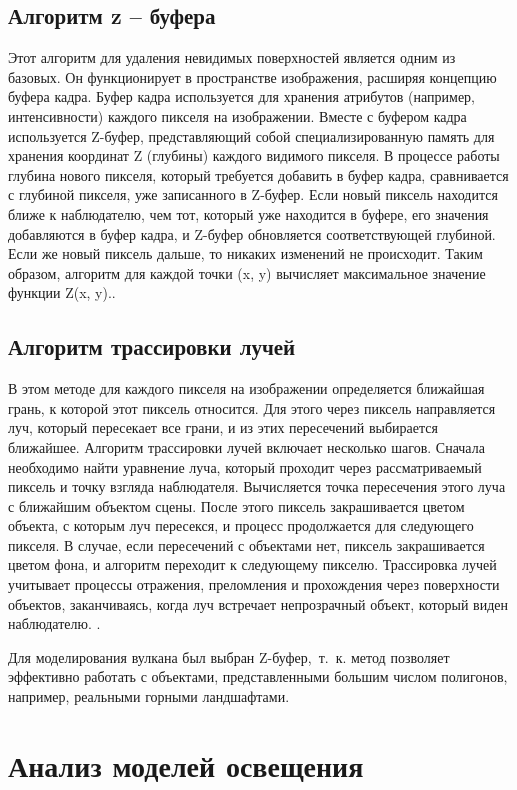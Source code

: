 \subsection{Алгоритм z – буфера}
Этот алгоритм для удаления невидимых поверхностей является одним из базовых. Он функционирует в пространстве изображения, расширяя концепцию буфера кадра. Буфер кадра используется для хранения атрибутов (например, интенсивности) каждого пикселя на изображении. Вместе с буфером кадра используется Z-буфер, представляющий собой специализированную память для хранения координат Z (глубины) каждого видимого пикселя. В процессе работы глубина нового пикселя, который требуется добавить в буфер кадра, сравнивается с глубиной пикселя, уже записанного в Z-буфер. Если новый пиксель находится ближе к наблюдателю, чем тот, который уже находится в буфере, его значения добавляются в буфер кадра, и Z-буфер обновляется соответствующей глубиной. Если же новый пиксель дальше, то никаких изменений не происходит. Таким образом, алгоритм для каждой точки (x, y) вычисляет максимальное значение функции Z(x, y).\cite{lit2}.


\subsection{Алгоритм трассировки лучей}
В этом методе для каждого пикселя на изображении определяется ближайшая грань, к которой этот пиксель относится. Для этого через пиксель направляется луч, который пересекает все грани, и из этих пересечений выбирается ближайшее. Алгоритм трассировки лучей включает несколько шагов. Сначала необходимо найти уравнение луча, который проходит через рассматриваемый пиксель и точку взгляда наблюдателя. Вычисляется точка пересечения этого луча с ближайшим объектом сцены. После этого пиксель закрашивается цветом объекта, с которым луч пересекся, и процесс продолжается для следующего пикселя. В случае, если пересечений с объектами нет, пиксель закрашивается цветом фона, и алгоритм переходит к следующему пикселю. Трассировка лучей учитывает процессы отражения, преломления и прохождения через поверхности объектов, заканчиваясь, когда луч встречает непрозрачный объект, который виден наблюдателю. 
\cite{lit2}.

Для моделирования вулкана был выбран Z-буфер,~т.~к. метод позволяет эффективно работать с объектами, представленными большим числом полигонов, например, реальными горными ландшафтами.

\section{Анализ моделей освещения}

